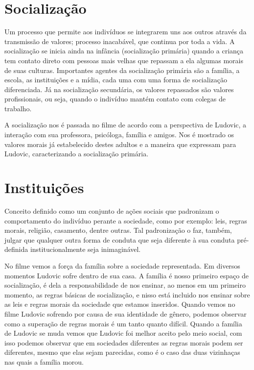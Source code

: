 \documentclass[
	12pt,				%
	openany,
	oneside,			%
	a4paper,			%
	chapter=TITLE,		%
	english,			%
	brazil				%
]{abntex2}
\begin{document}
\chapter{Socialização}
Um processo que permite aos indivíduos se integrarem uns aos outros através da transmissão de valores; processo inacabável, que continua por toda a vida. A socialização se inicia ainda na infância (socialização primária) quando a criança tem contato direto com pessoas mais velhas que repassam a ela algumas morais de suas culturas. Importantes agentes da socialização primária são a família, a escola, as instituições e a mídia, cada uma com uma forma de socialização diferenciada. Já na socialização secundária, os valores repassados são valores profissionais, ou seja, quando o indivíduo mantém contato com colegas de trabalho.

A socialização nos é passada no filme \cite{minhaVidaEmCorDeRosa} de acordo com a perspectiva de Ludovic, a interação com sua professora, psicóloga, família e amigos. Nos é mostrado os valores morais já estabelecido destes adultos e a maneira que expressam para Ludovic, caracterizando a socialização primária.

\chapter{Instituições}
Conceito definido como um conjunto de ações sociais que padronizam o comportamento do indivíduo perante a sociedade, como por exemplo: leis, regras morais, religião, casamento, dentre outras. Tal padronização o faz, também, julgar que qualquer outra forma de conduta que seja diferente à sua conduta pré-definida institucionalmente seja inimaginável.

No filme \cite{minhaVidaEmCorDeRosa} vemos a força da família sobre a sociedade representada. Em diversos momentos Ludovic sofre dentro de sua casa. A família é nosso primeiro espaço de socialização, é dela a responsabilidade de nos ensinar, ao menos em um primeiro momento, as regras básicas de socialização, e nisso está incluido nos ensinar sobre as leis e regras morais da sociedade que estamos inseridos. Quando vemos no filme Ludovic sofrendo por causa de sua identidade de gênero, podemos observar como a superação de regras morais é um tanto quanto difícil. Quando a família de Ludovic se muda vemos que Ludovic foi melhor aceito pelo meio social, com isso podemos observar que em sociedades diferentes as regras morais podem ser diferentes, mesmo que elas sejam parecidas, como é o caso das duas vizinhaças nas quais a família morou.

\postextual


\end{document}

